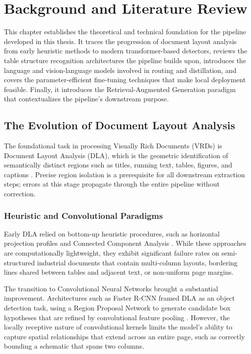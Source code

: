\chapter{Background and Literature Review}
\label{ch:background}

This chapter establishes the theoretical and technical foundation for the pipeline developed in this thesis. It traces the progression of document layout analysis from early heuristic methods to modern transformer-based detectors, reviews the table structure recognition architectures the pipeline builds upon, introduces the language and vision-language models involved in routing and distillation, and covers the parameter-efficient fine-tuning techniques that make local deployment feasible. Finally, it introduces the Retrieval-Augmented Generation paradigm that contextualizes the pipeline's downstream purpose.

\section{The Evolution of Document Layout Analysis}
\label{sec:layout_evolution}

The foundational task in processing Visually Rich Documents (VRDs) is Document Layout Analysis (DLA), which is the geometric identification of semantically distinct regions such as titles, running text, tables, figures, and captions \citep{docai_survey}. Precise region isolation is a prerequisite for all downstream extraction steps; errors at this stage propagate through the entire pipeline without correction.

\subsection{Heuristic and Convolutional Paradigms}

Early DLA relied on bottom-up heuristic procedures, such as horizontal projection profiles and Connected Component Analysis \citep{xycut_ogorman}. While these approaches are computationally lightweight, they exhibit significant failure rates on semi-structured industrial documents that contain multi-column layouts, bordering lines shared between tables and adjacent text, or non-uniform page margins.

The transition to Convolutional Neural Networks brought a substantial improvement. Architectures such as Faster R-CNN framed DLA as an object detection task, using a Region Proposal Network to generate candidate box hypotheses that are refined by convolutional feature pooling \citep{publaynet, yolo}. However, the locally receptive nature of convolutional kernels limits the model's ability to capture spatial relationships that extend across an entire page, such as correctly bounding a schematic that spans two columns.

